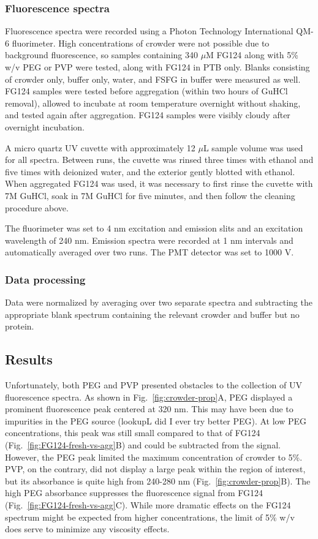\subsubsection{Fluorescence spectra}
Fluorescence spectra were recorded using a Photon Technology International QM-6 fluorimeter.  High concentrations of crowder were not possible due to background fluorescence, so samples containing 340 $\mu$M FG124 along with 5\% w/v PEG or PVP were tested, along with FG124 in PTB only.  Blanks consisting of crowder only, buffer only, water, and FSFG in buffer were measured as well.  FG124 samples were tested before aggregation (within two hours of GuHCl removal), allowed to incubate at room temperature overnight without shaking, and tested again after aggregation.  FG124 samples were visibly cloudy after overnight incubation.

A micro quartz UV cuvette with approximately 12 $\mu$L sample volume was used for all spectra.  Between runs, the cuvette was rinsed three times with ethanol and five times with deionized water, and the exterior gently blotted with ethanol.  When aggregated FG124 was used, it was necessary to first rinse the cuvette with 7M GuHCl, soak in 7M GuHCl for five minutes, and then follow the cleaning procedure above.

The fluorimeter was set to 4 nm excitation and emission slits and an excitation wavelength of 240 nm.  Emission spectra were recorded at 1 nm intervals and automatically averaged over two runs.  The PMT detector was set to 1000 V.

\subsubsection{Data processing}
Data were normalized by averaging over two separate spectra and subtracting the appropriate blank spectrum containing the relevant crowder and buffer but no protein.

\subsection{Results}
Unfortunately, both PEG and PVP presented obstacles to the collection of UV fluorescence spectra. As shown in Fig.~\ref{fig:crowder-prop}A, PEG displayed a prominent fluorescence peak centered at 320 nm.  This may have been due to impurities in the PEG source (lookupL did I ever try better PEG).  At low PEG concentrations, this peak was still small compared to that of FG124 (Fig.~\ref{fig:FG124-fresh-vs-agg}B) and could be subtracted from the signal.  However, the PEG peak limited the maximum concentration of crowder to 5\%.  PVP, on the contrary, did not display a large peak within the region of interest, but its absorbance is quite high from 240-280 nm (Fig.~\ref{fig:crowder-prop}B).  The high PEG absorbance suppresses the fluorescence signal from FG124 (Fig.~\ref{fig:FG124-fresh-vs-agg}C).  While more dramatic effects on the FG124 spectrum might be expected from higher concentrations, the limit of 5\% w/v does serve to minimize any viscosity effects.

